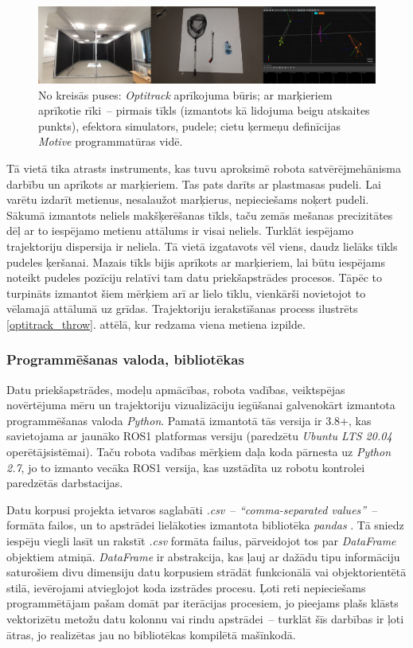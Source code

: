\documentclass[12pt, a4paper]{article}
\numberwithin{equation}{section} %
\begin{document}
\begin{figure}[t!]
    \centering
    \includegraphics[width=16cm,page=1]{../img/mocap_equipment.jpg}
    \caption{No kreisās puses: \textit{Optitrack} aprīkojuma būris; ar marķieriem aprīkotie rīki~-- pirmais tīkls (izmantots kā lidojuma beigu atskaites punkts), efektora simulators, pudele; cietu ķermeņu definīcijas \textit{Motive} programmatūras vidē.}
    \label{optitrack_gear}
\end{figure}

Tā vietā tika atrasts instruments, kas tuvu aproksimē robota satvērējmehānisma darbību un aprīkots ar marķieriem. Tas pats darīts ar plastmasas pudeli. Lai varētu izdarīt metienus, nesalaužot marķierus, nepieciešams noķert pudeli. Sākumā izmantots neliels makšķerēšanas tīkls, taču zemās mešanas precizitātes dēļ ar to iespējamo metienu attālums ir visai neliels. Turklāt iespējamo trajektoriju dispersija ir neliela. Tā vietā izgatavots vēl viens, daudz lielāks tīkls pudeles ķeršanai. Mazais tīkls bijis aprīkots ar marķieriem, lai būtu iespējams noteikt pudeles pozīciju relatīvi tam datu priekšapstrādes procesos. Tāpēc to turpināts izmantot šiem mērķiem arī ar lielo tīklu, vienkārši novietojot to vēlamajā attālumā uz grīdas. Trajektoriju ierakstīšanas process ilustrēts \ref{optitrack_throw}. attēlā, kur redzama viena metiena izpilde.

\subsubsection{Programmēšanas valoda, bibliotēkas}

Datu priekšapstrādes, modeļu apmācības, robota vadības, veiktspējas novērtējuma mēru un trajektoriju vizualizāciju iegūšanai galvenokārt izmantota programmēšanas valoda \textit{Python}. Pamatā izmantotā tās versija ir 3.8+, kas savietojama ar jaunāko ROS1 platformas versiju (paredzētu \textit{Ubuntu LTS 20.04} operētājsistēmai). Taču robota vadības mērķiem daļa koda pārnesta uz \textit{Python 2.7}, jo to izmanto vecāka ROS1 versija, kas uzstādīta uz robotu kontrolei paredzētās darbstacijas.

Datu korpusi projekta ietvaros saglabāti \textit{.csv}~-- \textit{``comma-separated values''}~-- formāta failos, un to apstrādei lielākoties izmantota bibliotēka \textit{pandas} \cite{pandas_docs}. Tā sniedz iespēju viegli lasīt un rakstīt \textit{.csv} formāta failus, pārveidojot tos par \textit{DataFrame} objektiem atmiņā. \textit{DataFrame} ir abstrakcija, kas ļauj ar dažādu tipu informāciju saturošiem divu dimensiju datu korpusiem strādāt funkcionālā vai objektorientētā stilā, ievērojami atvieglojot koda izstrādes procesu. Ļoti reti nepieciešams programmētājam pašam domāt par iterācijas procesiem, jo pieejams plašs klāsts vektorizētu metožu datu kolonnu vai rindu apstrādei~-- turklāt šīs darbības ir ļoti ātras, jo realizētas jau no bibliotēkas kompilētā mašīnkodā. 
\end{document}

